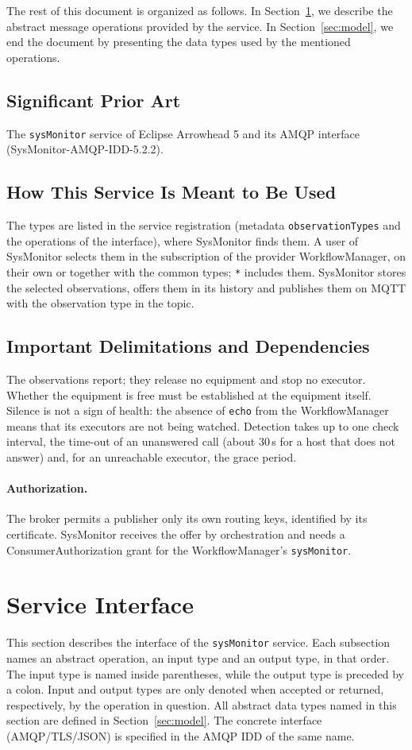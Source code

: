 \documentclass[a4paper]{arrowhead}
\begin{document}
The rest of this document is organized as follows.
In Section~\ref{sec:operations}, we describe the abstract message operations provided by the service.
In Section~\ref{sec:model}, we end the document by presenting the data types used by the mentioned operations.

\subsection{Significant Prior Art}
The \texttt{sysMonitor} service of Eclipse Arrowhead 5 and its AMQP interface (SysMonitor-AMQP-IDD-5.2.2).

\subsection{How This Service Is Meant to Be Used}
The types are listed in the service registration (metadata \texttt{observation\allowbreak{}Types} and the operations of the
interface), where SysMonitor finds them. A user of SysMonitor selects them in the subscription of the provider
WorkflowManager, on their own or together with the common types; \texttt{*} includes them. SysMonitor stores the
selected observations, offers them in its history and publishes them on MQTT with the observation type in the topic.

\subsection{Important Delimitations and Dependencies}
\label{sec:delimitations}
The observations report; they release no equipment and stop no executor. Whether the equipment is free
must be established at the equipment itself. Silence is not a sign of health: the absence of \texttt{echo} from the
WorkflowManager means that its executors are not being watched. Detection takes up to one check interval, the time-out
of an unanswered call (about 30\,s for a host that does not answer) and, for an unreachable executor, the grace period.

\paragraph{Authorization.} The broker permits a publisher only its own routing keys, identified by its certificate. SysMonitor receives
the offer by orchestration and needs a ConsumerAuthorization grant for the WorkflowManager's \texttt{sysMonitor}.

\newpage
\section{Service Interface}
\label{sec:operations}
This section describes the interface of the \texttt{sysMonitor} service. Each subsection names an abstract operation,
an input type and an output type, in that order. The input type is named inside parentheses, while the output type is
preceded by a colon. Input and output types are only denoted when accepted or returned, respectively, by the operation
in question. All abstract data types named in this section are defined in Section~\ref{sec:model}. The concrete
interface (AMQP/TLS/JSON) is specified in the AMQP IDD of the same name.
\end{document}
